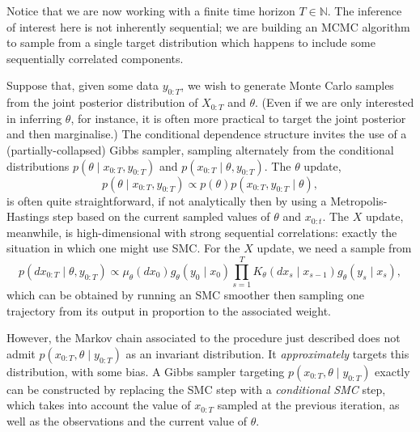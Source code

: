 Notice that we are now working with a finite time horizon $T\in\mathbb{N}$. The inference of interest here is not inherently sequential; we are building an MCMC algorithm to sample from a single target distribution which happens to include some sequentially correlated components.

Suppose that, given some data $y_{0:T}$, we wish to generate Monte Carlo samples from the joint posterior distribution of $X_{0:T}$ and $\theta$. (Even if we are only interested in inferring $\theta$, for instance, it is often more practical to target the joint posterior and then marginalise.)
The conditional dependence structure invites the use of a (partially-collapsed) Gibbs sampler, sampling alternately from the conditional distributions $p(\theta \mid x_{0:T}, y_{0:T})$ and $p(x_{0:T} \mid \theta, y_{0:T})$.
The $\theta$ update,
\begin{equation*}
p(\theta \mid x_{0:T}, y_{0:T}) \propto p(\theta) p(x_{0:T}, y_{0:T} \mid \theta) ,
\end{equation*}
is often quite straightforward, if not analytically then by using a Metropolis-Hastings step based on the current sampled values of $\theta$ and $x_{0:t}$. 
The $X$ update, meanwhile, is high-dimensional with strong sequential correlations: exactly the situation in which one might use SMC. 
For the $X$ update, we need a sample from
\begin{equation}\label{eq:PG_Xposterior}
p(dx_{0:T} \mid \theta, y_{0:T}) 
\propto \mu_\theta(dx_0) g_\theta(y_0\mid x_0) \prod_{s=1}^T K_\theta(dx_s \mid x_{s-1}) g_\theta(y_s \mid x_s) ,
\end{equation}
which can be obtained by running an SMC smoother then sampling one trajectory from its output in proportion to the associated weight.

However, the Markov chain associated to the procedure just described does not admit $p(x_{0:T},\theta \mid y_{0:T})$ as an invariant distribution. It \emph{approximately} targets this distribution, with some bias.
A Gibbs sampler targeting $p(x_{0:T},\theta \mid y_{0:T})$ exactly can be constructed by replacing the SMC step with a \emph{conditional SMC} step, which takes into account the value of $x_{0:T}$ sampled at the previous iteration, as well as the observations and the current value of $\theta$.

